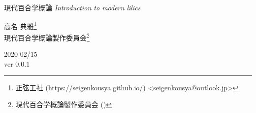 \documentclass[ %
	uplatex,%
	a5paper,%
	papersize%
	]{jsbook}
\begin{document}

						\begin{titlepage}
							\pagecolor{black}
							\color{white}
							\renewcommand{\thefootnote}{\textcolor{red}{\fnsymbol{footnote}}}
							
							\begin{center}
								\vspace*{20mm}
								\fontsize{36pt}{0pt} \selectfont
								現代百合学概論
								\vspace*{5mm}
								\fontsize{21pt}{3pt} \selectfont
								{\sl Introduction to modern lilics}
								\vspace{30mm}

								{\LARGE 高名 典雅\footnote[2]{\color{white}正弦工社 (https://seigenkousya.github.io/) <seigenkousya@outlook.jp>}}
								\vspace{2mm}\\
								\color{white}
								{\LARGE 現代百合学概論製作委員会\footnote[3]{\color{white}現代百合学概論製作委員会 () }}
								\vspace{10mm}\\
		
								\begin{flushright}
									\color{white}
									{\rm \Large 2020 02/15}\vspace{2mm}\\
									{\rm \Large ver 0.0.1}
								\end{flushright}

								\vspace{10mm}
							\end{center}
						\end{titlepage}
\end{document}
